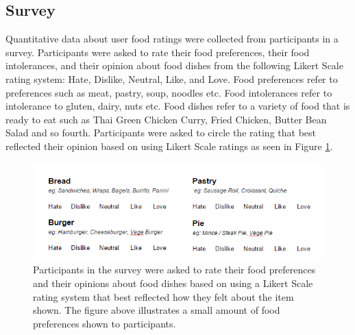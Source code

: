 \subsection{Survey}

Quantitative data about user food ratings were collected from participants in a survey. Participants were asked to rate their food preferences, their food intolerances, and their opinion about food dishes from the following Likert Scale rating system: Hate, Dislike, Neutral, Like, and Love. Food preferences refer to preferences such as meat, pastry, soup, noodles etc. Food intolerances refer to intolerance to gluten, dairy, nuts etc. Food dishes refer to a variety of food that is ready to eat such as Thai Green Chicken Curry, Fried Chicken, Butter Bean Salad and so fourth. Participants were asked to circle the rating that best reflected their opinion based on using Likert Scale ratings as seen in Figure \ref{fig:survey}.

\begin{figure}
\centering
\includegraphics[scale=1.0]{images/survey_preferences.png}
\caption{Participants in the survey were asked to rate their food preferences and their opinions about food dishes based on using a Likert Scale rating system that best reflected how they felt about the item shown. The figure above illustrates a small amount of food preferences shown to participants.}
\label{fig:survey}
\end{figure}

